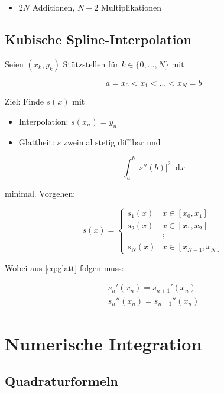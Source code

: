 \documentclass[a4paper, 14pt]{article}
\newcommand*\diff{\mathop{}\!\mathrm{d}}
\begin{document}
	\begin{itemize}
		\item $2N$ Additionen, $N + 2$ Multiplikationen
	\end{itemize}

	\subsection{Kubische Spline-Interpolation}

	Seien $(x_k, y_k)$ Stützstellen für $k \in \{ 0, ..., N \}$ mit

	\begin{equation}
		a = x_0 < x_1 < ... < x_N = b
	\end{equation}

	Ziel: Finde $s(x)$ mit

	\begin{itemize}
		\item Interpolation: $s(x_n) = y_n$
		\item Glattheit: $s$ zweimal stetig diff'bar und
	\end{itemize}

	\begin{equation} \label{eq:glatt}
		\int_a^b{|s''(b)|^2 \diff x}
	\end{equation}

	minimal.
	Vorgehen:

	\begin{equation}
		s(x) = \begin{cases}
			s_1(x) & x \in [x_0, x_1] \\
			s_2(x) & x \in [x_1, x_2] \\
			& \vdots \\
			s_N(x) & x \in [x_{N-1}, x_N]
		\end{cases}
	\end{equation}

	Wobei aus \ref{eq:glatt} folgen muss:

	\begin{align}
		s_n'(x_n) = s_{n + 1}'(x_n) \\
		s_n''(x_n) = s_{n + 1}''(x_n)
	\end{align}

	\section{Numerische Integration}

	\subsection{Quadraturformeln}
\end{document}
